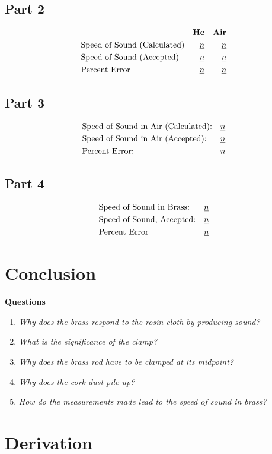 \documentclass[twocolumn,english]{IEEEtran}
\theoremstyle{plain}
\theoremstyle{plain}
\begin{document}
\subsection*{Part 2}
\begin{align*}
 &					&\text{\textbf{He}}	&	&\text{\textbf{Air}}	\\
 &\text{Speed of Sound (Calculated)} 	&\text{\underline{$n$}} &	&\text{\underline{$n$}} \\
 &\text{Speed of Sound (Accepted)} 	&\text{\underline{$n$}} &	&\text{\underline{$n$}} \\
 &\text{Percent Error}			&\text{\underline{$n$}}	&	&\text{\underline{$n$}}
\end{align*}

\subsection*{Part 3}
\begin{align*}
 &\text{Speed of Sound in Air (Calculated):}	&\text{\underline{$n$}} \\
 &\text{Speed of Sound in Air (Accepted):}	&\text{\underline{$n$}} \\
 &\text{Percent Error:}				&\text{\underline{$n$}}
\end{align*}

\subsection*{Part 4}
\begin{align*}
 &\text{Speed of Sound in Brass:}	&\text{\underline{$n$}} \\
 &\text{Speed of Sound, Accepted:}	&\text{\underline{$n$}} \\ %
 &\text{Percent Error}			&\text{\underline{$n$}}
\end{align*}

\section{Conclusion}
\textbf{Questions}
\begin{enumerate}
 \item \textit{Why does the brass respond to the rosin cloth by producing sound?}
 \item \textit{What is the significance of the clamp?}
 \item \textit{Why does the brass rod have to be clamped at its midpoint?}
 \item \textit{Why does the cork dust pile up?}
 \item \textit{How do the measurements made lead to the speed of sound in brass?}
\end{enumerate}

\appendices{}

\section{Derivation}\label{append:deriv}


%
%
\end{document}
